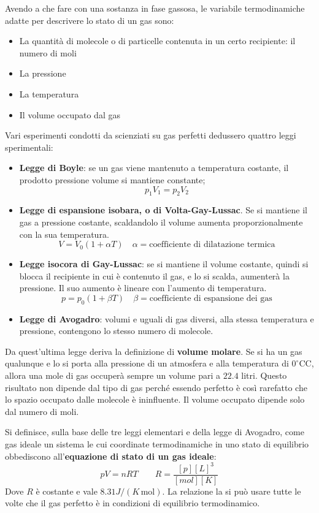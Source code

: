 \documentclass[10pt,a4paper]{book}
\renewcommand{\degree}{^\circ\text{C}} %
\begin{document}
Avendo a che fare con una sostanza in fase gassosa, le variabile termodinamiche adatte per descrivere lo stato di un gas sono:
\begin{itemize}
	\item La quantità di molecole o di particelle contenuta in un certo recipiente: il numero di moli
	\item La pressione
	\item La temperatura
	\item Il volume occupato dal gas
\end{itemize}
Vari esperimenti condotti da scienziati su gas perfetti dedussero quattro leggi sperimentali:
\begin{itemize}
	\item \textbf{Legge di Boyle}: se un gas viene mantenuto a temperatura costante, il prodotto pressione volume si mantiene constante;
	\[ \boxed{p_1 V_1=p_2 V_2} \]
	\item \textbf{Legge di espansione isobara, o di Volta-Gay-Lussac}. Se si mantiene il gas a pressione costante, scaldandolo il volume aumenta proporzionalmente con la sua temperatura.
	\[ \boxed{V=V_0(1+\alpha T) } \quad \alpha = \text{coefficiente di dilatazione termica} \]
	\item \textbf{Legge isocora di Gay-Lussac}: se si mantiene il volume costante, quindi si blocca il recipiente in cui è contenuto il gas, e lo si scalda, aumenterà la pressione. Il suo aumento è lineare con l'aumento di temperatura.
	\[ \boxed{p=p_0(1+\beta T) } \quad \beta = \text{coefficiente di espansione dei gas} \]
	\item \textbf{Legge di Avogadro}: volumi e uguali di gas diversi, alla stessa temperatura e pressione, contengono lo stesso numero di molecole.
\end{itemize}
Da quest'ultima legge deriva la definizione di \textbf{volume molare}. Se si ha un gas qualunque e lo si porta alla pressione di un atmosfera e alla temperatura di $0 \degree \text{C}$, allora una mole di gas occuperà sempre un volume pari a $22.4$ litri. Questo risultato non dipende dal tipo di gas perché essendo perfetto è così rarefatto che lo spazio occupato dalle molecole è ininfluente. Il volume occupato dipende solo dal numero di moli.

Si definisce, sulla base delle tre leggi elementari e della legge di Avogadro, come gas ideale un sistema le cui coordinate termodinamiche in uno stato di equilibrio obbediscono all'\textbf{equazione di stato di un gas ideale}:
\[
	\boxed{pV=nRT} \qquad R=\frac{[p][L]^3}{[mol][K]}
\]
Dove $R$ è costante e vale $8.31 J/(K\,\text{mol})$.
La relazione la si può usare tutte le volte che il gas perfetto è in condizioni di equilibrio termodinamico.
\end{document}

